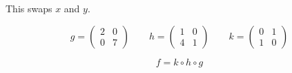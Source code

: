 \documentclass{tufte-handout}
\begin{document}
\begin{question}
This swaps \( x \) and \( y \).

\vspace{3cm}
\qpart

\[ g = \begin{pmatrix}
    2 & 0 \\
    0 & 7
    \end{pmatrix}
    \qquad
    h = \begin{pmatrix}
        1 & 0 \\
        4 & 1
    \end{pmatrix}
    \qquad
    k = \begin{pmatrix}
        0 & 1 \\
        1 & 0
    \end{pmatrix} 
\]

\[ f = k \circ h \circ g \]


\end{question}
\end{document}

